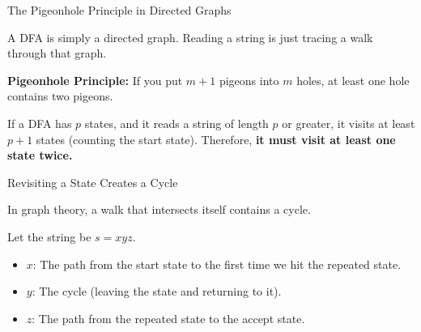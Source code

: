 \documentclass[10pt,aspectratio=169]{beamer}
\begin{document}
\begin{frame}{The Pigeonhole Principle in Directed Graphs}

A DFA is simply a directed graph. 
Reading a string is just tracing a walk through that graph.

\vspace{0.8em}
\textbf{Pigeonhole Principle:} If you put $m+1$ pigeons into $m$ holes, at least one hole contains two pigeons.

\vspace{0.8em}
If a DFA has $p$ states, and it reads a string of length $p$ or greater, it visits at least $p+1$ states (counting the start state).
Therefore, \textbf{it must visit at least one state twice.}

\end{frame}

\begin{frame}{Revisiting a State Creates a Cycle}

In graph theory, a walk that intersects itself contains a cycle. 

\vspace{0.8em}
Let the string be $s = xyz$.
\begin{itemize}
    \item $x$: The path from the start state to the first time we hit the repeated state.
    \item $y$: The cycle (leaving the state and returning to it).
    \item $z$: The path from the repeated state to the accept state.
\end{itemize}

\begin{center}
\end{center}

\end{frame}
\end{document}
